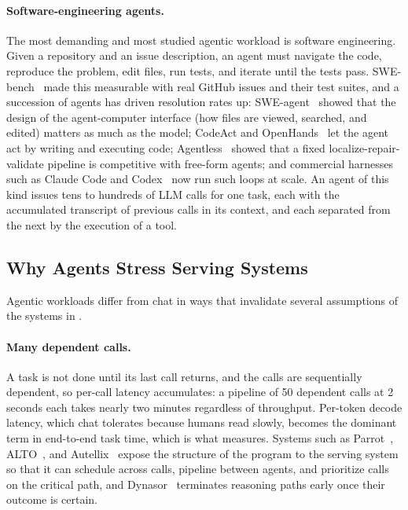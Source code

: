 \paragraph{Software-engineering agents.}
The most demanding and most studied agentic workload is software engineering.
Given a repository and an issue description, an agent must navigate the code, reproduce the problem, edit files, run tests, and iterate until the tests pass.
SWE-bench~\cite{jimenez2024swebenchlanguagemodelsresolve} made this measurable with real GitHub issues and their test suites, and a succession of agents has driven resolution rates up: SWE-agent~\cite{yang2024sweagent} showed that the design of the agent-computer interface (how files are viewed, searched, and edited) matters as much as the model; CodeAct and OpenHands~\cite{wang2024executablecodeactionselicit,openhands} let the agent act by writing and executing code; Agentless~\cite{xia2024agentless} showed that a fixed localize-repair-validate pipeline is competitive with free-form agents; and commercial harnesses such as Claude Code and Codex~\cite{anthropic2025claudecode,codex} now run such loops at scale.
An agent of this kind issues tens to hundreds of LLM calls for one task, each with the accumulated transcript of previous calls in its context, and each separated from the next by the execution of a tool.

\subsection{Why Agents Stress Serving Systems}
\label{background:subsec:agents_stress}

Agentic workloads differ from chat in ways that invalidate several assumptions of the systems in .

\paragraph{Many dependent calls.}
A task is not done until its last call returns, and the calls are sequentially dependent, so per-call latency accumulates: a pipeline of 50 dependent calls at 2 seconds each takes nearly two minutes regardless of throughput.
Per-token decode latency, which chat tolerates because humans read slowly, becomes the dominant term in end-to-end task time, which is what  measures.
Systems such as Parrot~\cite{lin2024parrot}, ALTO~\cite{10.1145/3642970.3655844}, and Autellix~\cite{luo2025autellix} expose the structure of the program to the serving system so that it can schedule across calls, pipeline between agents, and prioritize calls on the critical path, and Dynasor~\cite{fu2024efficientlyservingllmreasoning} terminates reasoning paths early once their outcome is certain.

